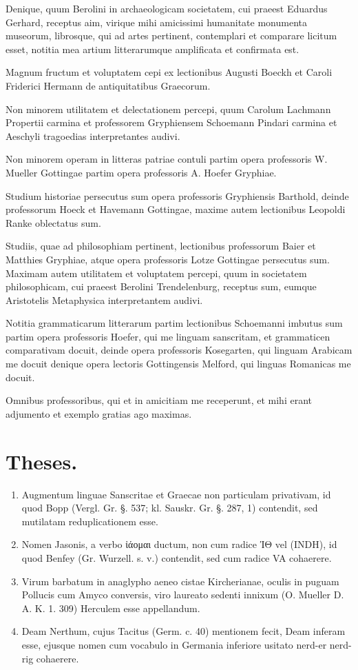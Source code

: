 \documentclass[landscape, a4paper, 11pt, oneside, polutonikogreek, german]{article}
\begin{document}
Denique, quum Berolini in archaeologicam societatem, cui praeest Eduardus Gerhard, receptus aim, virique mihi amicissimi humanitate monumenta museorum, librosque, qui ad artes pertinent, contemplari et comparare licitum esset, notitia mea artium litterarumque amplificata et confirmata est.

Magnum fructum et voluptatem cepi ex lectionibus Augusti Boeckh et Caroli Friderici Hermann de antiquitatibus Graecorum.

Non minorem utilitatem et delectationem percepi, quum Carolum Lachmann Propertii carmina et professorem Gryphiensem Schoemann Pindari carmina et Aeschyli tragoedias interpretantes audivi.

Non minorem operam in litteras patriae contuli partim opera professoris W. Mueller Gottingae partim opera professoris A. Hoefer Gryphiae.

Studium historiae persecutus sum opera professoris Gryphiensis Barthold, deinde professorum Hoeck et Havemann Gottingae, maxime autem lectionibus Leopoldi Ranke oblectatus sum.

Studiis, quae ad philosophiam pertinent, lectionibus professorum Baier et Matthies Gryphiae, atque opera professoris Lotze Gottingae persecutus sum. Maximam autem utilitatem et voluptatem percepi, quum in societatem philosophicam, cui praeest Berolini Trendelenburg, receptus sum, eumque Aristotelis Metaphysica interpretantem audivi.

Notitia grammaticarum litterarum partim lectionibus Schoemanni imbutus sum partim opera professoris Hoefer, qui me linguam sanscritam, et grammaticen comparativam docuit, deinde opera professoris Kosegarten, qui linguam Arabicam me docuit denique opera lectoris Gottingensis Melford, qui linguas Romanicas me docuit.

Omnibus professoribus, qui et in amicitiam me receperunt, et mihi erant adjumento et exemplo gratias ago maximas.
\clearpage
\section*{Theses.}
\begin{enumerate}
    \item Augmentum linguae Sanscritae et Graecae non particulam privativam, id quod Bopp (Vergl. Gr. §. 537; kl. Sauskr. Gr. §. 287, 1) contendit, sed mutilatam reduplicationem esse.
    \item Nomen Jasonis, a verbo ἰάομαι ductum, non cum radice ἸΘ vel (INDH), id quod Benfey (Gr. Wurzell. s. v.) contendit, sed cum radice VA cohaerere.
    \item Virum barbatum in anaglypho aeneo cistae Kircherianae, oculis in puguam Pollucis cum Amyco conversis, viro laureato sedenti innixum (O. Mueller D. A. K. 1. 309) Herculem esse appellandum.
    \item Deam Nerthum, cujus Tacitus (Germ. c. 40) mentionem fecit, Deam inferam esse, ejusque nomen cum vocabulo in Germania inferiore usitato nerd-er nerd-rig cohaerere.
\end{enumerate}
\clearpage
\end{document}
